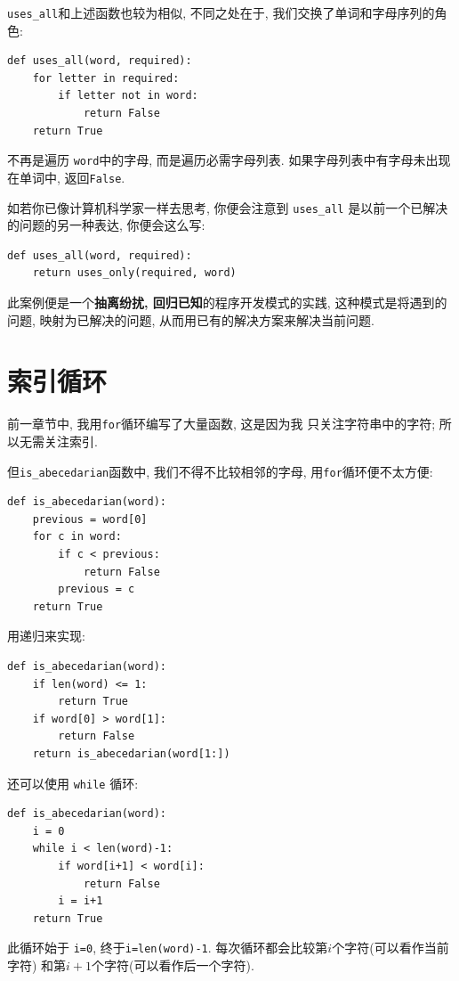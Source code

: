 \documentclass[10pt]{book}
\begin{document}
\verb"uses_all"和上述函数也较为相似, 不同之处在于, 
我们交换了单词和字母序列的角色:

\begin{verbatim}
def uses_all(word, required):
    for letter in required: 
        if letter not in word:
            return False
    return True
\end{verbatim}
%
不再是遍历 {\tt word}中的字母, 
而是遍历必需字母列表. 
如果字母列表中有字母未出现在单词中, 返回{\tt False}.

如若你已像计算机科学家一样去思考, 你便会注意到 \verb"uses_all" 
是以前一个已解决的问题的另一种表达, 你便会这么写:

\begin{verbatim}
def uses_all(word, required):
    return uses_only(required, word)
\end{verbatim}
%
此案例便是一个{\bf 抽离纷扰, 回归已知}的程序开发模式的实践, 
这种模式是将遇到的问题, 映射为已解决的问题, 
从而用已有的解决方案来解决当前问题.   


\section{索引循环}
前一章节中, 我用{\tt for}循环编写了大量函数, 这是因为我
只关注字符串中的字符; 所以无需关注索引. 

但\verb"is_abecedarian"函数中, 我们不得不比较相邻的字母, 
用{\tt for}循环便不太方便:

\begin{verbatim}
def is_abecedarian(word):
    previous = word[0]
    for c in word:
        if c < previous:
            return False
        previous = c
    return True
\end{verbatim}

用递归来实现:

\begin{verbatim}
def is_abecedarian(word):
    if len(word) <= 1:
        return True
    if word[0] > word[1]:
        return False
    return is_abecedarian(word[1:])
\end{verbatim}

还可以使用 {\tt while} 循环:

\begin{verbatim}
def is_abecedarian(word):
    i = 0
    while i < len(word)-1:
        if word[i+1] < word[i]:
            return False
        i = i+1
    return True
\end{verbatim}
%
此循环始于 {\tt i=0}, 终于{\tt i=len(word)-1}. 
每次循环都会比较第$i$个字符(可以看作当前字符)
和第$i+1$个字符(可以看作后一个字符). 
\end{document}
